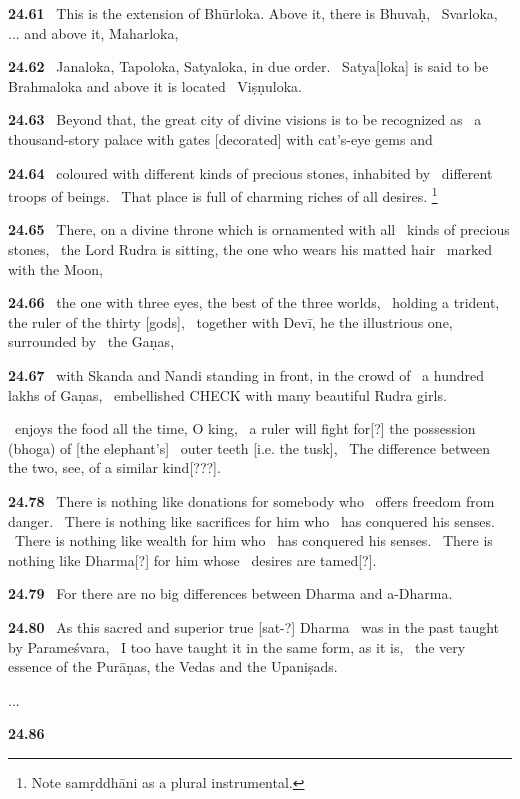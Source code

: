 \documentclass{article}
\begin{document}
\textbf{24.61}%
\ This is the extension of Bhūrloka. Above it, there is Bhuvaḥ,%
\ Svarloka, ... and above it, Maharloka,%


\textbf{24.62}%
\ Janaloka, Tapoloka, Satyaloka, in due order.%
\ Satya[loka] is said to be Brahmaloka and above it is located%
\                         Viṣṇuloka.%


\textbf{24.63}%
\ Beyond that, the great city of divine visions is to be recognized as%
\ a thousand-story palace with gates [decorated] with cat's-eye gems and%


\textbf{24.64}%
\ coloured with different kinds of precious stones, inhabited by%
\                         different troops of beings.%
\ That place is full of charming riches of all desires.%
\footnote{Note samṛddhāni as a plural instrumental. }%


\textbf{24.65}%
\ There, on a divine throne which is ornamented with all%
\                 kinds of precious stones,%
\ the Lord Rudra is sitting, the one who wears his matted hair%
\              marked with the Moon,%


\textbf{24.66}%
\ the one with three eyes, the best of the three worlds,%
\                 holding a trident, the ruler of the thirty [gods],%
\ together with Devī, he the illustrious one, surrounded by%
\                                 the Gaṇas,%


\textbf{24.67}%
\ with Skanda and Nandi standing in front, in the crowd of%
\                       a hundred lakhs of Gaṇas,%
\ embellished CHECK with many beautiful Rudra girls.%


\ enjoys the food all the time, O king,%
\ a ruler will fight for[?] the possession (bhoga) of [the elephant's]%
\                 outer teeth [i.e. the tusk],%
\ The difference between the two, see, of a similar kind[???].%


\textbf{24.78}%
\ There is nothing like donations for somebody who%
\                 offers freedom from danger.%
\ There is nothing like sacrifices for him who%
\                         has conquered his senses.%
\ There is nothing like wealth for him who%
\                         has conquered his senses.%
\ There is nothing like Dharma[?] for him whose%
\                         desires are tamed[?].%


\textbf{24.79}%
\ For there are no big differences between Dharma and a-Dharma.%


\textbf{24.80}%
\ As this sacred and superior true [sat-?] Dharma%
\                 was in the past taught by Parameśvara,%
\ I too have taught it in the same form, as it is,%
\                 the very essence of the Purāṇas, the Vedas and the Upaniṣads.%


...


\textbf{24.86}%
\end{document}
